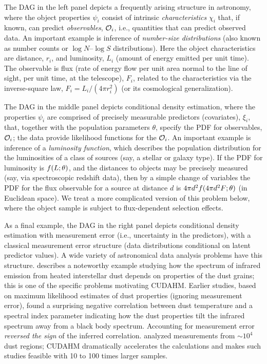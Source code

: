 The DAG in the left panel depicts a frequently arising structure in astronomy, where the object properties $\psi_i$ consist of intrinsic \emph{characteristics} $\chi_i$ that, if known, can predict \emph{observables}, $\mathcal{O}_i$, i.e., quantities that can predict observed data.
An important example is inference of \emph{number-size distributions} (also known as number counts or $\log N$--$\log S$ distributions).
Here the object characteristics are distance, $r_i$, and luminosity, $L_i$ (amount of energy emitted per unit time).
The observable is flux (rate of energy flow per unit area normal to the line of sight, per unit time, at the telescope), $F_i$, related to the characteristics via the inverse-square law, $F_i = L_i/(4\pi r_i^2)$ (or its cosmological generalization).

The DAG in the middle panel depicts conditional density estimation, where the properties $\psi_i$ are comprised of precisely measurable predictors (covariates), $\xi_i$, that, together with the population parameters $\theta$, specify the PDF for observables, $\mathcal{O}_i$; the data provide likelihood functions for the $\mathcal{O}_i$.
An important example is inference of a \emph{luminosity function}, which describes the population distribution for the luminosities of a class of sources (say, a stellar or galaxy type).
If the PDF for luminosity is $f(L;\theta)$, and the distances to objects may be precisely measured (say, via spectroscopic redshift data), then by a simple change of variables the PDF for the flux observable for a source at distance $d$ is $4\pi d^2 f(4\pi d^2 F; \theta)$ (in Euclidean space).
We treat a more complicated version of this problem below, where the object sample is subject to flux-dependent selection effects.

As a final example, the DAG in the right panel depicts conditional density estimation with measurement error (i.e., uncertainty in the predictors), with a classical measurement error structure (data distributions conditional on latent predictor values).
A wide variety of astronomical data analysis problems have this structure.
\cite{K+12-DustSEDs} describes a noteworthy example studying how the spectrum of infrared emission from heated interstellar dust depends on properties of the dust grains; this is one of the specific problems motivating CUDAHM.
Earlier studies, based on maximum likelihood estimates of dust properties (ignoring measurement error), found a surprising negative correlation between dust temperature and a spectral index parameter indicating how the dust properties tilt the infrared spectrum away from a black body spectrum.
Accounting for measurement error \emph{reversed the sign} of the inferred correlation.
\cite{K+12-DustSEDs} analyzed measurements from $\sim 10^4$ dust regions; CUDAHM dramatically accelerates the calculations and makes such studies feasible with 10 to 100 times larger samples.

